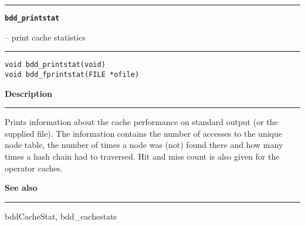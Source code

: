 \begin{minipage}{\textwidth}

\noindent\begin{minipage}{\textwidth}
\rule{\textwidth}{0.5mm}
{\tt\bf bdd\_printstat }
\--- print cache statistics  \hspace{\fill}
\\\rule[1.5ex]{\textwidth}{0.5mm}
\end{minipage}

\noindent\begin{verbatim}
void bdd_printstat(void)
void bdd_fprintstat(FILE *ofile) 
\end{verbatim}

\vspace{\parsep}\noindent
{\bf Description}\\\rule[1.5ex]{\textwidth}{0.2mm}\vspace{-1.5ex}\setlength{\parindent}{1em}
Prints information about the cache performance on standard output
           (or the supplied file). The information contains the number of
	   accesses to the unique node table, the number of times a node
	   was (not) found there and how many times a hash chain had to
	   traversed. Hit and miss count is also given for the operator
	   caches. 

\vspace{\parsep}\vspace{\baselineskip}\noindent
{\bf See also}\\\rule[1.5ex]{\textwidth}{0.2mm}\vspace{-1.5ex}
bddCacheStat, bdd\_cachestats 
\end{minipage}
\vspace{8ex}
